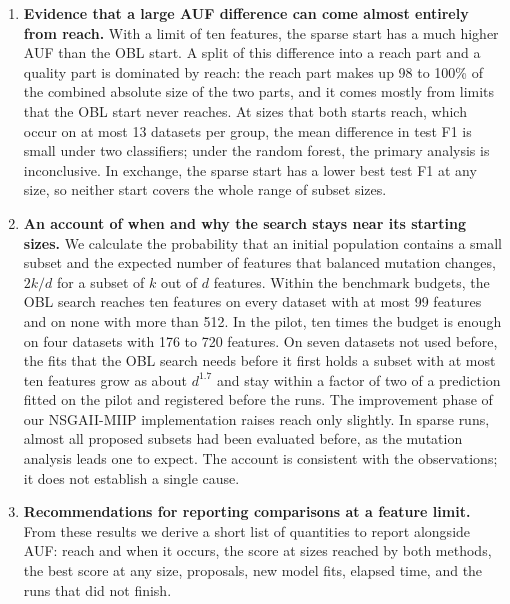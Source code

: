 \begin{enumerate}
    \item \textbf{Evidence that a large AUF difference can come almost entirely from reach.}
    With a limit of ten features, the sparse start has a much higher AUF than the OBL start. A split of this difference into a reach part and a quality part is dominated by reach: the reach part makes up 98 to 100\% of the combined absolute size of the two parts, and it comes mostly from limits that the OBL start never reaches. At sizes that both starts reach, which occur on at most 13 datasets per group, the mean difference in test F1 is small under two classifiers; under the random forest, the primary analysis is inconclusive. In exchange, the sparse start has a lower best test F1 at any size, so neither start covers the whole range of subset sizes.

    \item \textbf{An account of when and why the search stays near its starting sizes.}
    We calculate the probability that an initial population contains a small subset and the expected number of features that balanced mutation changes, $2k/d$ for a subset of $k$ out of $d$ features. Within the benchmark budgets, the OBL search reaches ten features on every dataset with at most 99 features and on none with more than 512. In the pilot, ten times the budget is enough on four datasets with 176 to 720 features. On seven datasets not used before, the fits that the OBL search needs before it first holds a subset with at most ten features grow as about $d^{1.7}$ and stay within a factor of two of a prediction fitted on the pilot and registered before the runs. The improvement phase of our NSGAII-MIIP implementation raises reach only slightly. In sparse runs, almost all proposed subsets had been evaluated before, as the mutation analysis leads one to expect. The account is consistent with the observations; it does not establish a single cause.

    \item \textbf{Recommendations for reporting comparisons at a feature limit.}
    From these results we derive a short list of quantities to report alongside AUF: reach and when it occurs, the score at sizes reached by both methods, the best score at any size, proposals, new model fits, elapsed time, and the runs that did not finish.
\end{enumerate}

